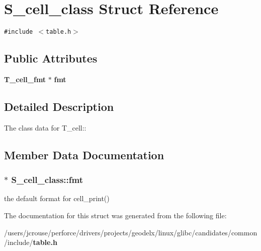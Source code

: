\section{S\_\-cell\_\-class Struct Reference}
\label{structS__cell__class}
{\tt \#include $<$table.h$>$}

\subsection*{Public Attributes}
\begin{CompactItemize}
\item 
{\bf T\_\-cell\_\-fmt} $\ast$ {\bf fmt}
\end{CompactItemize}


\subsection{Detailed Description}
The class data for T\_\-cell:: 



\subsection{Member Data Documentation}
\subsubsection{$\ast$ S\_\-cell\_\-class::fmt}\label{structS__cell__class_m0}


the default format for cell\_\-print() 

The documentation for this struct was generated from the following file:\begin{CompactItemize}
\item 
/users/jcrouse/perforce/drivers/projects/geodelx/linux/glibc/candidates/common/include/{\bf table.h}\end{CompactItemize}

